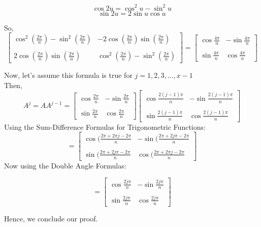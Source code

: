 \documentclass[12pt]{article}
\begin{document}
\[
	\cos 2u = \cos^2u - \sin^2u
\]
\[
	\sin 2u = 2\sin u\cos u
\]

So, 
\[
	\begin{bmatrix}
		\cos^2(\frac{2\pi}{n}) - \sin^2(\frac{2\pi}{n}) & -2\cos (\frac{2\pi}{n})\sin (\frac{2\pi}{n}) \\
		\\
		2\cos (\frac{2\pi}{n}) \sin (\frac{2\pi}{n}) & \cos^2(\frac{2\pi}{n}) - \sin^2(\frac{2\pi}{n})  
	\end{bmatrix}
	=
	\begin{bmatrix}
		\cos\frac{4\pi}{n} & -\sin\frac{4\pi}{n} \\
		\\
		\sin\frac{4\pi}{n} &  \cos\frac{4\pi}{n}
	\end{bmatrix}
\]

Now, let's assume this formula is true for $j = 1,2,3,...,x-1$ \\
Then, \\
\[
	A^j = AA^{j-1}
	=
	\begin{bmatrix}
		\cos\frac{2\pi}{n} & -\sin\frac{2\pi}{n} \\
		\\
		\sin\frac{2\pi}{n} &  \cos\frac{2\pi}{n}
	\end{bmatrix}
	\begin{bmatrix}
		\cos\frac{2(j-1)\pi}{n} & -\sin\frac{2(j-1)\pi}{n} \\
		\\
		\sin\frac{2(j-1)\pi}{n} &  \cos\frac{2(j-1)\pi}{n}
	\end{bmatrix}
\]
Using the Sum-Difference Formulas for Trigonometric Functions:
\[
	=
	\begin{bmatrix}
		\cos (\frac{2\pi + 2\pi j - 2\pi}{n} & -\sin (\frac{2\pi + 2j\pi - 2\pi}{n} \\
		\\
		\sin (\frac{2\pi + 2j\pi - 2\pi}{n} & \cos (\frac{2\pi + 2\pi j - 2\pi}{n}  
	\end{bmatrix}
	\]
	Now using the Double Angle Formulas:

	\[
		=
		\begin{bmatrix}
			\cos\frac{2j\pi}{n} & -\sin\frac{2j\pi}{n} \\
			\\
			\sin\frac{2j\pi}{n} &  \cos\frac{2j\pi}{n}
		\end{bmatrix}
	\]

	Hence, we conclude our proof. \\

	\section*{}
\end{document}
